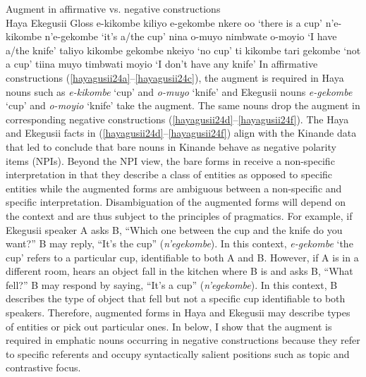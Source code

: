 \documentclass[output=paper]{langscibook}
\begin{document}
\ea Augment in affirmative vs. negative constructions\smallskip\\
\label{hayagusii24}
             \hphantom{abc }Haya			\hphantom{ombe kiliyo }Ekegusii			\hphantom{be nkere oo }Gloss
  \ea\label{hayagusii24a}	e-kikombe kiliyo\hspace{1ex} 	e-gekombe nkere oo		‘there is a cup’
  \ex\label{hayagusii24b}	n’e-kikombe\hphantom{iliyo}\hspace{1ex}		n’e-gekombe\hphantom{kere oo}			‘it’s a/the cup’
  \ex\label{hayagusii24c}	nina o-muyo\hphantom{iliyi}\hspace{1ex} 		nimbwate o-moyio\hphantom{tt}		‘I have a/the knife’
  \ex\label{hayagusii24d}	taliyo kikombe\hphantom{yi}\hspace{1ex} gekombe nkeiyo\hphantom{i oo}		‘no cup’
  \ex\label{hayagusii24e}	ti kikombe\hphantom{kiloyo}\hspace{1ex}		tari gekombe\hphantom{keri oo}			‘not a cup’
  \ex\label{hayagusii24f}	tiina muyo\hphantom{kiloyo}\hspace{1ex}		timbwati moyio\hphantom{it ot}		‘I don’t have any knife’
  \z
\z
In affirmative constructions (\ref{hayagusii24a}--\ref{hayagusii24c}), the augment is required in Haya nouns such as \textit{e-kikombe} ‘cup’ and \textit{o-muyo} ‘knife’ and Ekegusii nouns \textit{e-gekombe} ‘cup’ and \textit{o-moyio} ‘knife’ take the augment. The same nouns drop the augment in corresponding negative constructions (\ref{hayagusii24d}--\ref{hayagusii24f}). The Haya and Ekegusii facts in (\ref{hayagusii24d}--\ref{hayagusii24f}) align with the Kinande data that led \citet{progovac1993non} to conclude that bare nouns in Kinande behave as negative polarity items (NPIs). Beyond the NPI view, the bare forms in  receive a non-specific interpretation in that they describe a class of entities as opposed to specific entities while the augmented forms are ambiguous between a non-specific and specific interpretation. Disambiguation of the augmented forms will depend on the context and are thus subject to the principles of pragmatics. For example, if Ekegusii speaker A asks B, “Which one between the cup and the knife do you want?” B may reply, “It’s the cup” (\textit{n’egekombe}). In this context, \textit{e-gekombe} `the cup' refers to a particular cup, identifiable to both A and B.  However, if A is in a different room, hears an object fall in the kitchen where B is and asks B, ``What fell?” B may respond by saying, “It’s a cup” (\textit{n’egekombe}). In this context, B describes the type of object that fell but not a specific cup identifiable to both speakers. Therefore, augmented forms in Haya and Ekegusii may describe types of entities or pick out particular ones. In  below, I show that the augment is required in emphatic nouns occurring in negative constructions because they refer to specific referents and occupy syntactically salient positions such as topic and contrastive focus.
\end{document}

